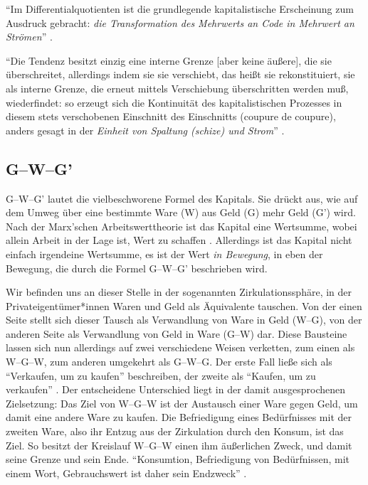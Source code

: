 \documentclass[12pt,
               DIV13,
               paper=a4,
               twoside=false,
               onehalfspacing,
               bibliography=totoc,
               toc=graduated,
               draft,
               ]{scrartcl}
\newcommand{\pc}[2]{\parencite[#1]{#2}}
\newcommand{\vgl}[2]{\parencite[vgl.][#1]{#2}}
\newcommand{\worries}[1]{\ifdraft{\textcolor{blue}{\texttt{(#1)}}}{}}
\newcommand{\gwg}{G--W--G'\xspace}
\newcommand{\wgw}{W--G--W\xspace}
\begin{document}
"`Im Differentialquotienten ist die grundlegende kapitalistische
Erscheinung zum Ausdruck gebracht: \emph{die Transformation des
Mehrwerts an Code in Mehrwert an Strömen}"' \pc{S. 292 f.}{ao}.

"`Die Tendenz besitzt einzig eine interne Grenze [aber keine äußere],
die sie überschreitet, allerdings indem sie sie verschiebt, das heißt
sie rekonstituiert, sie als interne Grenze, die erneut mittels
Verschiebung überschritten \worries{Selbst-Überschreitung} werden muß,
wiederfindet: so erzeugt sich die Kontinuität des kapitalistischen
Prozesses in diesem stets verschobenen Einschnitt des Einschnitts
(coupure de coupure), anders gesagt in der \emph{Einheit von Spaltung
(schize) und Strom}"' \pc{S. 296, meine Hervorh.}{ao}.



\subsection{\gwg}

\gwg lautet die vielbeschworene Formel des Kapitals. Sie drückt aus,
wie auf dem Umweg über eine bestimmte Ware (W) aus Geld (G) mehr Geld
(G') wird. Nach der Marx'schen Arbeitswerttheorie ist das Kapital eine
Wertsumme, wobei allein Arbeit in der Lage ist, Wert zu schaffen
\vgl{181}{kap}. Allerdings ist das Kapital nicht einfach irgendeine
Wertsumme, es ist der Wert \emph{in Bewegung}, in eben der Bewegung,
die durch die Formel \gwg beschrieben wird.



Wir befinden uns an dieser Stelle in der sogenannten
Zirkulationssphäre, in der Privateigentümer*innen Waren und Geld als
Äquivalente tauschen. Von der einen Seite stellt sich dieser Tausch
als Verwandlung von Ware in Geld (W--G), von der anderen Seite als
Verwandlung von Geld in Ware (G--W) dar. Diese Bausteine lassen sich
nun allerdings auf zwei verschiedene Weisen verketten, zum einen als
\wgw, zum anderen umgekehrt als G--W--G. Der erste Fall ließe sich als
"`Verkaufen, um zu kaufen"' beschreiben, der zweite als "`Kaufen, um
zu verkaufen"' \vgl{162}{kap}. Der entscheidene Unterschied liegt in
der damit ausgesprochenen Zielsetzung: Das Ziel von \wgw ist der
Austausch einer Ware gegen Geld, um damit eine andere Ware zu kaufen.
Die Befriedigung eines Bedürfnisses mit der zweiten Ware, also ihr
Entzug aus der Zirkulation durch den Konsum, ist das Ziel. So besitzt
der Kreislauf \wgw einen ihm äußerlichen Zweck, und damit seine Grenze
und sein Ende. "`Konsumtion, Befriedigung von Bedürfnissen, mit einem
Wort, Gebrauchswert ist daher sein Endzweck"' \pc{164}{kap}.
\end{document}

